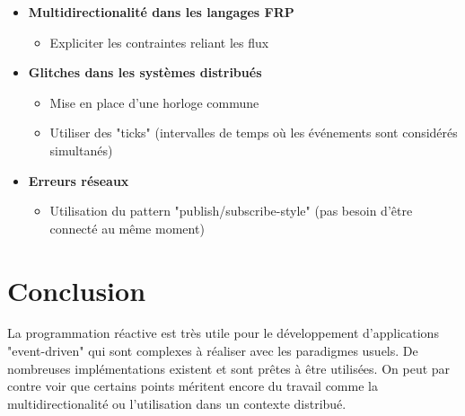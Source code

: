 \documentclass[10pt,final]{IEEEtran}
\begin{document}
\begin{itemize}
    \item \textbf{Multidirectionalité dans les langages FRP}
        \begin{itemize}
            \item Expliciter les contraintes reliant les flux 
        \end{itemize}
    \item \textbf{Glitches dans les systèmes distribués}
        \begin{itemize}
            \item Mise en place d'une horloge commune
            \item Utiliser des "ticks" (intervalles de temps où les événements sont considérés simultanés)
        \end{itemize}
    \item \textbf{Erreurs réseaux}
        \begin{itemize}
            \item Utilisation du pattern "publish/subscribe-style" (pas besoin d'être connecté au même moment)
        \end{itemize}
\end{itemize}

\section{Conclusion}

La programmation réactive est très utile pour le développement d'applications "event-driven" qui sont complexes à réaliser avec les paradigmes usuels. De nombreuses implémentations existent et sont prêtes à être utilisées. On peut par contre voir que certains points méritent encore du travail comme la multidirectionalité ou l'utilisation dans un contexte distribué.
\end{document}
